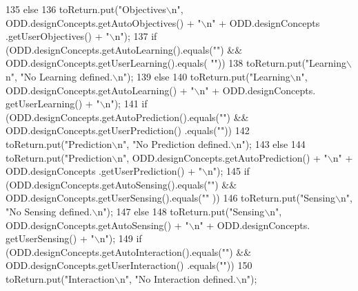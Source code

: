 \begin{DoxyCode}
135         \textcolor{keywordflow}{else}
136             toReturn.put(\textcolor{stringliteral}{"Objectives\(\backslash\)n"}, ODD.designConcepts.getAutoObjectives() + \textcolor{stringliteral}{"\(\backslash\)n"} + ODD.designConcepts
      .getUserObjectives() + \textcolor{stringliteral}{"\(\backslash\)n"});
137         \textcolor{keywordflow}{if} (ODD.designConcepts.getAutoLearning().equals(\textcolor{stringliteral}{""}) && ODD.designConcepts.getUserLearning().equals(\textcolor{stringliteral}{
      ""}))
138             toReturn.put(\textcolor{stringliteral}{"Learning\(\backslash\)n"}, \textcolor{stringliteral}{"No Learning defined.\(\backslash\)n"});
139         \textcolor{keywordflow}{else}
140             toReturn.put(\textcolor{stringliteral}{"Learning\(\backslash\)n"}, ODD.designConcepts.getAutoLearning() + \textcolor{stringliteral}{"\(\backslash\)n"} + ODD.designConcepts.
      getUserLearning() + \textcolor{stringliteral}{"\(\backslash\)n"});
141         \textcolor{keywordflow}{if} (ODD.designConcepts.getAutoPrediction().equals(\textcolor{stringliteral}{""}) && ODD.designConcepts.getUserPrediction()
      .equals(\textcolor{stringliteral}{""}))
142             toReturn.put(\textcolor{stringliteral}{"Prediction\(\backslash\)n"}, \textcolor{stringliteral}{"No Prediction defined.\(\backslash\)n"});
143         \textcolor{keywordflow}{else}
144             toReturn.put(\textcolor{stringliteral}{"Prediction\(\backslash\)n"}, ODD.designConcepts.getAutoPrediction() + \textcolor{stringliteral}{"\(\backslash\)n"} + ODD.designConcepts
      .getUserPrediction() + \textcolor{stringliteral}{"\(\backslash\)n"});
145         \textcolor{keywordflow}{if} (ODD.designConcepts.getAutoSensing().equals(\textcolor{stringliteral}{""}) && ODD.designConcepts.getUserSensing().equals(\textcolor{stringliteral}{""}
      ))
146             toReturn.put(\textcolor{stringliteral}{"Sensing\(\backslash\)n"}, \textcolor{stringliteral}{"No Sensing defined.\(\backslash\)n"});
147         \textcolor{keywordflow}{else}        
148             toReturn.put(\textcolor{stringliteral}{"Sensing\(\backslash\)n"}, ODD.designConcepts.getAutoSensing() + \textcolor{stringliteral}{"\(\backslash\)n"} + ODD.designConcepts.
      getUserSensing() + \textcolor{stringliteral}{"\(\backslash\)n"});
149         \textcolor{keywordflow}{if} (ODD.designConcepts.getAutoInteraction().equals(\textcolor{stringliteral}{""}) && ODD.designConcepts.getUserInteraction()
      .equals(\textcolor{stringliteral}{""}))
150             toReturn.put(\textcolor{stringliteral}{"Interaction\(\backslash\)n"}, \textcolor{stringliteral}{"No Interaction defined.\(\backslash\)n"});

\end{DoxyCode}
